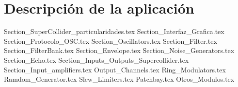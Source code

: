 \chapter{Descripción de la aplicación}


	{Section_SuperCollider_particularidades.tex}
	{Section_Interfaz_Grafica.tex}
	{Section_Protocolo_OSC.tex}
	{Section_Oscillators.tex}
	{Section_Filter.tex}	
	{Section_FilterBank.tex}	
	{Section_Envelope.tex}	
	{Section_Noise_Generators.tex}
	{Section_Echo.tex}
	{Section_Inputs_Outputs_Supercollider.tex}
	{Section_Input_amplifiers.tex}
	{Output_Channels.tex}
	{Ring_Modulators.tex}
	{Ramdom_Generator.tex}
	{Slew_Limiters.tex}
	{Patchbay.tex}
	{Otros_Modulos.tex}